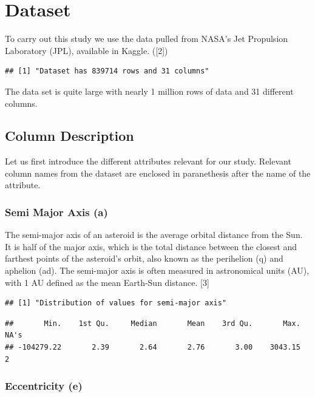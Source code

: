 \documentclass[
]{article}
\begin{document}
\hypertarget{dataset}{%
\section{Dataset}\label{dataset}}

To carry out this study we use the data pulled from NASA's Jet
Propulsion Laboratory (JPL), available in Kaggle. ({[}2{]})

\begin{verbatim}
## [1] "Dataset has 839714 rows and 31 columns"
\end{verbatim}

The data set is quite large with nearly 1 million rows of data and 31
different columns.

\hypertarget{column-description}{%
\subsection{Column Description}\label{column-description}}

Let us first introduce the different attributes relevant for our study.
Relevant column names from the dataset are enclosed in paranethesis
after the name of the attribute.

\hypertarget{semi-major-axis-a}{%
\subsubsection{Semi Major Axis (a)}\label{semi-major-axis-a}}

The semi-major axis of an asteroid is the average orbital distance from
the Sun. It is half of the major axis, which is the total distance
between the closest and farthest points of the asteroid's orbit, also
known as the perihelion (q) and aphelion (ad). The semi-major axis is
often measured in astronomical units (AU), with 1 AU defined as the mean
Earth-Sun distance. {[}3{]}

\begin{verbatim}
## [1] "Distribution of values for semi-major axis"
\end{verbatim}

\begin{verbatim}
##       Min.    1st Qu.     Median       Mean    3rd Qu.       Max.       NA's 
## -104279.22       2.39       2.64       2.76       3.00    3043.15          2
\end{verbatim}

\hypertarget{eccentricity-e}{%
\subsubsection{Eccentricity (e)}\label{eccentricity-e}}
\end{document}
